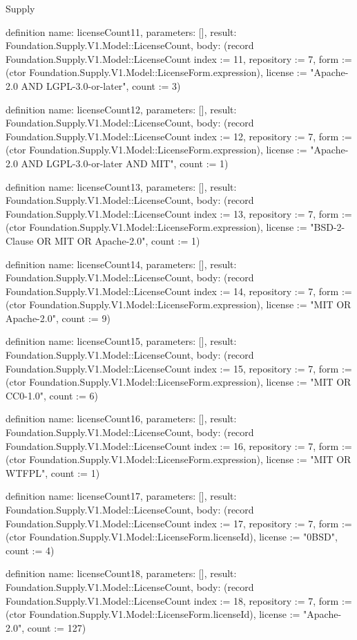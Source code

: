 \begin{lexlean}{Supply}
\begin{semanticmodule}
definition{
  name: licenseCount11,
  parameters: [],
  result: Foundation.Supply.V1.Model::LicenseCount,
  body: (record Foundation.Supply.V1.Model::LicenseCount {index := 11, repository := 7, form := (ctor Foundation.Supply.V1.Model::LicenseForm.expression), license := "Apache-2.0 AND LGPL-3.0-or-later", count := 3})
}

definition{
  name: licenseCount12,
  parameters: [],
  result: Foundation.Supply.V1.Model::LicenseCount,
  body: (record Foundation.Supply.V1.Model::LicenseCount {index := 12, repository := 7, form := (ctor Foundation.Supply.V1.Model::LicenseForm.expression), license := "Apache-2.0 AND LGPL-3.0-or-later AND MIT", count := 1})
}

definition{
  name: licenseCount13,
  parameters: [],
  result: Foundation.Supply.V1.Model::LicenseCount,
  body: (record Foundation.Supply.V1.Model::LicenseCount {index := 13, repository := 7, form := (ctor Foundation.Supply.V1.Model::LicenseForm.expression), license := "BSD-2-Clause OR MIT OR Apache-2.0", count := 1})
}

definition{
  name: licenseCount14,
  parameters: [],
  result: Foundation.Supply.V1.Model::LicenseCount,
  body: (record Foundation.Supply.V1.Model::LicenseCount {index := 14, repository := 7, form := (ctor Foundation.Supply.V1.Model::LicenseForm.expression), license := "MIT OR Apache-2.0", count := 9})
}

definition{
  name: licenseCount15,
  parameters: [],
  result: Foundation.Supply.V1.Model::LicenseCount,
  body: (record Foundation.Supply.V1.Model::LicenseCount {index := 15, repository := 7, form := (ctor Foundation.Supply.V1.Model::LicenseForm.expression), license := "MIT OR CC0-1.0", count := 6})
}

definition{
  name: licenseCount16,
  parameters: [],
  result: Foundation.Supply.V1.Model::LicenseCount,
  body: (record Foundation.Supply.V1.Model::LicenseCount {index := 16, repository := 7, form := (ctor Foundation.Supply.V1.Model::LicenseForm.expression), license := "MIT OR WTFPL", count := 1})
}

definition{
  name: licenseCount17,
  parameters: [],
  result: Foundation.Supply.V1.Model::LicenseCount,
  body: (record Foundation.Supply.V1.Model::LicenseCount {index := 17, repository := 7, form := (ctor Foundation.Supply.V1.Model::LicenseForm.licenseId), license := "0BSD", count := 4})
}

definition{
  name: licenseCount18,
  parameters: [],
  result: Foundation.Supply.V1.Model::LicenseCount,
  body: (record Foundation.Supply.V1.Model::LicenseCount {index := 18, repository := 7, form := (ctor Foundation.Supply.V1.Model::LicenseForm.licenseId), license := "Apache-2.0", count := 127})
}


\end{semanticmodule}
\end{lexlean}

